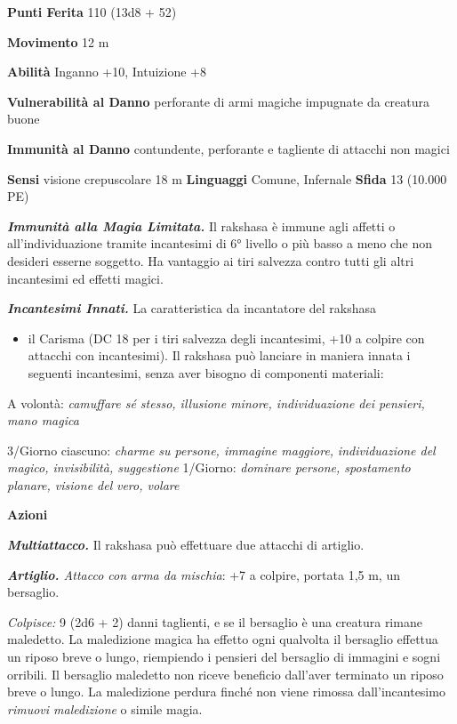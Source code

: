 \begin{multicols}{2}
\textbf{Punti Ferita} 110 (13d8 + 52)

\textbf{Movimento} 12 m

\textbf{Abilità} Inganno +10, Intuizione +8

\textbf{Vulnerabilità al Danno} perforante di armi magiche impugnate da
creatura buone

\textbf{Immunità al Danno} contundente, perforante e tagliente di
attacchi non magici

\textbf{Sensi} visione crepuscolare 18 m
\textbf{Linguaggi} Comune, Infernale \textbf{Sfida} 13 (10.000 PE)

\emph{\textbf{Immunità alla Magia Limitata.}} Il rakshasa è immune agli
affetti o all'individuazione tramite incantesimi di 6° livello o più
basso a meno che non desideri esserne soggetto. Ha vantaggio ai tiri
salvezza contro tutti gli altri incantesimi ed effetti magici.

\emph{\textbf{Incantesimi Innati.}} La caratteristica da incantatore del
rakshasa


\begin{itemize}
\item
  il Carisma (DC 18 per i tiri salvezza degli incantesimi, +10 a colpire
  con attacchi con incantesimi). Il rakshasa può lanciare in maniera
  innata i seguenti incantesimi, senza aver bisogno di componenti
  materiali:
\end{itemize}


A volontà: \emph{camuffare sé stesso, illusione minore, individuazione}
\emph{dei pensieri, mano magica}

3/Giorno ciascuno: \emph{charme su persone, immagine maggiore,}
\emph{individuazione del magico, invisibilità, suggestione} 1/Giorno:
\emph{dominare persone, spostamento planare, visione del} \emph{vero,
volare}

\textbf{Azioni}

\emph{\textbf{Multiattacco.}} Il rakshasa può effettuare due attacchi di
artiglio.

\emph{\textbf{Artiglio.} Attacco con arma da mischia}: +7 a colpire,
portata 1,5 m, un bersaglio.

\emph{Colpisce:} 9 (2d6 + 2) danni taglienti, e se il bersaglio è una
creatura rimane maledetto. La maledizione magica ha effetto ogni
qualvolta il bersaglio effettua un riposo breve o lungo, riempiendo i
pensieri del bersaglio di immagini e sogni orribili. Il bersaglio
maledetto non riceve beneficio dall'aver terminato un riposo breve o
lungo. La maledizione perdura finché non viene rimossa dall'incantesimo
\emph{rimuovi maledizione} o simile magia.




\end{multicols}
